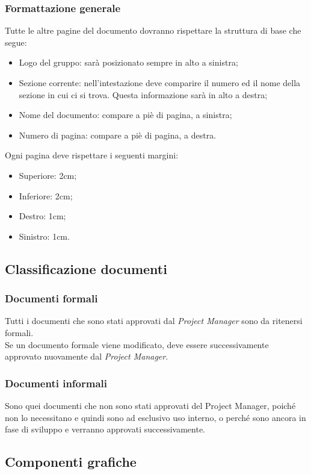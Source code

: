 \documentclass[12pt,a4paper,titlepage]{article}
\begin{document}
\subsubsection{Formattazione generale}
Tutte le altre pagine del documento dovranno rispettare la struttura di base che segue:
\begin{itemize}
	\item Logo del gruppo: sarà posizionato sempre in alto a sinistra;
	\item Sezione corrente: nell'intestazione deve comparire il numero ed il nome della sezione in cui ci si trova. Questa informazione sarà in alto a destra;
	\item Nome del documento: compare a piè di pagina, a sinistra;
	\item Numero di pagina: compare a piè di pagina, a destra.
\end{itemize} 
Ogni pagina deve rispettare i seguenti margini: 
\begin{itemize}
	\item Superiore: 2cm;
	\item Inferiore: 2cm;
	\item Destro: 1cm;
	\item Sinistro: 1cm.
\end{itemize}

\subsection{Classificazione documenti}
\subsubsection{Documenti formali}
Tutti i documenti che sono stati approvati dal \textit{Project Manager} sono da ritenersi formali.\\ 
Se un documento formale viene modificato, deve essere successivamente approvato nuovamente
dal \textit{Project Manager}. 

\subsubsection{Documenti informali}
Sono quei documenti che non sono stati approvati del Project Manager, poiché non lo necessitano e quindi sono ad esclusivo uso interno, o perché sono ancora in fase di sviluppo e verranno 
approvati successivamente.

\subsection{Componenti grafiche}
\end{document}
